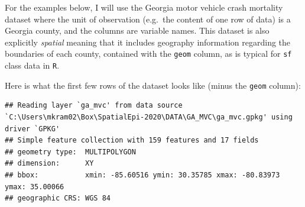 \documentclass[
]{book}
\newcommand{\passthrough}[1]{#1}
\begin{document}
For the examples below, I will use the Georgia motor vehicle crash mortality dataset where the unit of observation (e.g.~the content of one row of data) is a Georgia county, and the columns are variable names. This dataset is also explicitly \emph{spatial} meaning that it includes geography information regarding the boundaries of each county, contained with the \passthrough{\lstinline!geom!} column, as is typical for \passthrough{\lstinline!sf!} class data in \passthrough{\lstinline!R!}.

Here is what the first few rows of the dataset looks like (minus the \passthrough{\lstinline!geom!} column):

\begin{lstlisting}
## Reading layer `ga_mvc' from data source `C:\Users\mkram02\Box\SpatialEpi-2020\DATA\GA_MVC\ga_mvc.gpkg' using driver `GPKG'
## Simple feature collection with 159 features and 17 fields
## geometry type:  MULTIPOLYGON
## dimension:      XY
## bbox:           xmin: -85.60516 ymin: 30.35785 xmax: -80.83973 ymax: 35.00066
## geographic CRS: WGS 84
\end{lstlisting}

 
  \providecommand{\huxb}[2]{\arrayrulecolor[RGB]{#1}\global\arrayrulewidth=#2pt}
  \providecommand{\huxvb}[2]{\color[RGB]{#1}\vrule width #2pt}
  \providecommand{\huxtpad}[1]{\rule{0pt}{#1}}
  \providecommand{\huxbpad}[1]{\rule[-#1]{0pt}{#1}}
\end{document}
